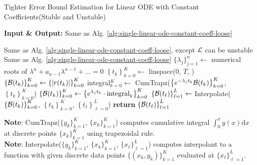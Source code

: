     \begin{algorithm}
        \caption{Tighter Error Bound Estimation for Linear ODE with Constant Coefficients\quad  (Stable and Unstable)}\label{alg:single-linear-ode-constant-coeff-tight}
        \textbf{Input \& Output:} Same as Alg. \ref{alg:single-linear-ode-constant-coeff-loose}
        \begin{algorithmic}
            \Require Same as Alg. \ref{alg:single-linear-ode-constant-coeff-loose}, except $\mathcal{L}$ can be unstable
            \Ensure Same as Alg. \ref{alg:single-linear-ode-constant-coeff-loose}
            \State $\{\lambda_j\}_{j=1}^{n} \gets$ numerical roots of $\lambda^n+a_{n-1}\lambda^{n-1}+\dots=0$
            \State $\left\{t_k\right\}_{k=0}^{K} \gets$ linspace($0$, $T$, )
            \State $\left\{\mathcal{B}(t_k)\right\}_{k=0}^{K} \gets \left\{|r(t_k)|\right\}_{k=0}^{K}$
                \State integral$_{k=0}^{K} \gets$ CumTrapz($\left\{e^{-\lambda_j t_{k}} \mathcal{B}(t_k)\right\}_{k=0}^{K}$, $\left\{t_k\right\}_{k=0}^{K}$) 
                \State $\left\{\mathcal{B}(t_k)\right\}_{k=0}^{K} \gets \left\{e^{\lambda_j t_{k}}\cdot \text{integral}_k \right\}_{k=0}^{K}$ 
            \EndFor
            \State $\left\{\mathcal{B}(t_\ell)\right\}_{\ell=1}^{L} \gets $ Interpolate($\left\{\mathcal{B}(t_k)\right\}_{k=0}^{K}$, $\left\{t_k\right\}_{k=0}^{K}$, $\left\{t_\ell\right\}_{\ell=0}^{L}$) 
            \State \textbf{return} $\left\{\mathcal{B}(t_\ell)\right\}_{\ell=1}^{L}$ 
        \end{algorithmic}

        \vspace{0.5em} 
        \textbf{Note}: CumTrapz($\{y_k\}_{k=1}^K$, $\{x_k\}_{k=1}^K$) computes cumulative integral $\int_{0}^x y(x)\mathrm{d}x$ at discrete points $\{x_k\}_{k=1}^K$ using trapezoidal rule.\\
        \textbf{Note}: Interpolate($\{y_k\}_{k=1}^K$, $\{x_k\}_{k=1}^K$, $\{x_\ell\}_{\ell=1}^L$) computes interpolant to a function with given discrete data points $\{(x_k, y_k)\}_{k=1}^K$ evaluated at $\{x_\ell\}_{\ell=1}^L$.
    \end{algorithm}

